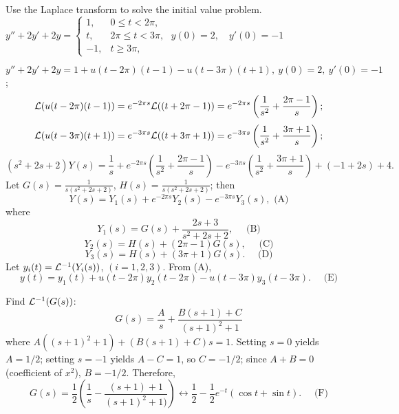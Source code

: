 \documentclass{ximera}
\begin{document}
\begin{problem}\label{exer:8.5.20} Use the Laplace transform to solve the initial value problem.
$y''+2y'+2y=\left\{\begin{array}{rl}1,&0\le
t<2\pi,\\t,&2\pi\le t<3\pi,\\-1,&t\ge 3\pi,\end{array}\right.\;
y(0)=2,\quad y'(0)=-1$

\begin{solution}
$y''+2y'+2y=1+u(t-2\pi)(t-1)-u(t-3\pi)(t+1),\ y(0)=2,\ y'(0)=-1$;
$$
{\cal L}(u(t-2\pi)(t-1))=e^{-2\pi s}{\cal L}((t+2\pi-1))
=e^{-2\pi s}\left(\frac{1}{s^2}+\frac{2\pi-1}{s}\right);
$$
$$
{\cal L}(u(t-3\pi)(t+1))=e^{-3\pi s}{\cal L}((t+3\pi+1))
=e^{-3\pi s}\left(\frac{1}{s^2}+\frac{3\pi+1}{s}\right);
$$
$$
(s^2+2s+2)Y(s)=\frac{1}{s}+
e^{-2\pi s}\left(\frac{1}{s^2}+\frac{2\pi-1}{s}\right)
-e^{-3\pi s}\left(\frac{1}{s^2}+\frac{3\pi+1}{s}\right)+(-1+2s)+4.
$$
Let $G(s)=\frac{1}{s(s^2+2s+2)}$,
 $H(s)=\frac{1}{s(s^2+2s+2)}$; then
\begin{equation*}
Y(s)=Y_1(s)+e^{-2\pi s}Y_2(s)-e^{-3\pi s}Y_3(s),\text{ (A)}
\end{equation*}
where
\begin{equation*}
Y_1(s)= G(s)+\frac{2s+3}{s^2+2s+2},\quad\text{ (B)}
\end{equation*}
\begin{equation*}
Y_2(s)=H(s)+(2\pi-1)G(s),\quad\text{ (C)}
\end{equation*}
\begin{equation*}
Y_3(s)=H(s)+(3\pi+1)G(s). \quad\text{ (D)}
\end{equation*}
Let $y_i(t)={\cal L}^{-1}(Y_i(s))$, $(i=1,2,3)$. From (A),
\begin{equation*}
y(t)=y_1(t)+u(t-2\pi)y_2(t-2\pi)-u(t-3\pi)y_3(t-3\pi).\quad\text{ (E)}
\end{equation*}

Find ${\cal L}^{-1}(G(s))$:
$$
G(s)=\frac{A}{s}+\frac{B(s+1)+C}{(s+1)^2+1}
$$
where
$A((s+1)^2+1)+(B(s+1)+C)s=1$. Setting $s=0$ yields $A=1/2$;
setting $s=-1$ yields $A-C=1$, so $C=-1/2$; since $A+B=0$
(coefficient of $x^2$), $B=-1/2$. Therefore,
\begin{equation*}
G(s)=\frac{1}{2}\left(\frac{1}{s}-\frac{(s+1)+1}{(s+1)^2+1)}\right)
\leftrightarrow \frac{1}{2}-\frac{1}{2}e^{-t}(\cos t+\sin t).
\quad\text{ (F)}
\end{equation*}



\end{solution}
\end{problem}
\end{document}
